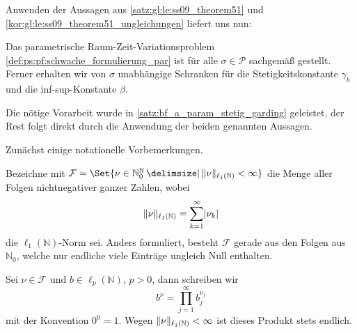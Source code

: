 Anwenden der Aussagen aus \cref{satz:gl:le:ss09_theorem51} und \cref{kor:gl:le:ss09_theorem51_ungleichungen} liefert uns nun:
\begin{Korollar}
\label{satz:ps:eel:schwache_formulierung_sachgemaess_gestellt}
    Das parametrische Raum-Zeit-Variationsproblem \cref{def:ps:pf:schwache_formulierung_par} ist für alle $\sigma \in \mathcal P$ sachgemäß gestellt.
    Ferner erhalten wir von $\sigma$ unabhängige Schranken für die Stetigkeitskonstante $\gamma_{b}$ und die inf-sup-Konstante $\beta$.

    \begin{Beweis}
        Die nötige Vorarbeit wurde in \cref{satz:bf_a_param_stetig_garding} geleistet, der Rest folgt direkt durch die Anwendung der beiden genannten Aussagen.
    \end{Beweis}
\end{Korollar}

Zunächst einige notationelle Vorbemerkungen.
\begin{Bemerkung}
    Bezeichne mit $\mathcal F = \Set{ \nu \in \mathbb{N}^{\mathbb{N}}_{0} \given \norm{\nu}_{\ell_{1}(\mathbb{N})} < \infty }$ die Menge aller Folgen nichtnegativer ganzer Zahlen, wobei
    \begin{equation}
        \lVert\nu\rVert_{\ell_{1}(\mathbb{N})} = \sum_{k = 1}^{\infty} \lvert\nu_{k}\rvert
    \end{equation}
    die $\ell_{1}(\mathbb{N})$-Norm sei.
    Anders formuliert, besteht $\mathcal F$ gerade aus den Folgen aus $\mathbb{N}_{0}$, welche nur endliche viele Einträge ungleich Null enthalten.

    Sei $\nu \in \mathcal F$ und $b \in \ell_{p}(\mathbb{N})$, $p > 0$, dann schreiben wir
    \begin{equation}
        b^{\nu} = \prod_{j = 1}^{\infty} b_{j}^{\nu_{j}}
    \end{equation}
    mit der Konvention $0^{0} = 1$.
    Wegen $\lVert\nu\rVert_{\ell_{1}(\mathbb{N})} < \infty$ ist dieses Produkt stets endlich.
\end{Bemerkung}


